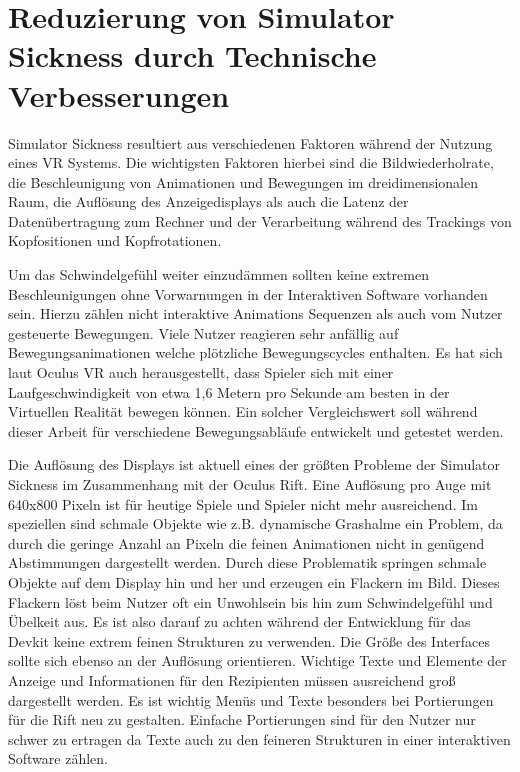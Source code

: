 \documentclass[pagesize, paper=a4, fontsize=12pt,titlepage=true, headings=small, headnosepline, abstractoff, liststotoc, nochapterprefix, plainheadsepline, twoside]{scrreprt}
\begin{document}
\section{Reduzierung von Simulator Sickness durch Technische Verbesserungen}
Simulator Sickness resultiert aus verschiedenen Faktoren während der Nutzung eines VR Systems. Die wichtigsten Faktoren hierbei sind die Bildwiederholrate, die Beschleunigung von Animationen und Bewegungen im dreidimensionalen Raum, die Auflösung des Anzeigedisplays als auch die Latenz der Datenübertragung zum Rechner und der Verarbeitung während des Trackings von Kopfositionen und Kopfrotationen. 

Um das Schwindelgefühl weiter einzudämmen sollten keine extremen Beschleunigungen ohne Vorwarnungen in der Interaktiven Software vorhanden sein. Hierzu zählen nicht interaktive Animations Sequenzen als auch vom Nutzer gesteuerte Bewegungen. Viele Nutzer reagieren sehr anfällig auf Bewegungsanimationen welche plötzliche Bewegungscycles enthalten. Es hat sich laut Oculus VR auch herausgestellt, dass Spieler sich mit einer Laufgeschwindigkeit von etwa 1,6 Metern pro Sekunde am besten in der Virtuellen Realität bewegen können. Ein solcher Vergleichswert soll während dieser Arbeit für verschiedene Bewegungsabläufe entwickelt und getestet werden.

Die Auflösung des Displays ist aktuell eines der größten Probleme der Simulator Sickness im Zusammenhang mit der Oculus Rift.  Eine Auflösung pro Auge mit 640x800 Pixeln ist für heutige Spiele und Spieler nicht mehr ausreichend. Im speziellen sind schmale Objekte wie z.B. dynamische Grashalme ein Problem, da durch die geringe Anzahl an Pixeln die feinen Animationen nicht in genügend Abstimmungen dargestellt werden. Durch diese Problematik springen schmale Objekte auf dem Display hin und her und erzeugen ein Flackern im Bild. Dieses Flackern löst beim Nutzer oft ein Unwohlsein bis hin zum Schwindelgefühl und Übelkeit aus. Es ist also darauf zu achten während der Entwicklung für das Devkit keine extrem feinen Strukturen zu verwenden. Die Größe des Interfaces sollte sich ebenso an der Auflösung orientieren. Wichtige Texte und Elemente der Anzeige und Informationen für den Rezipienten müssen ausreichend groß dargestellt werden. Es ist wichtig Menüs und Texte besonders bei Portierungen für die Rift neu zu gestalten. Einfache Portierungen sind für den Nutzer nur schwer zu ertragen da Texte auch zu den feineren Strukturen in einer interaktiven Software zählen.
\end{document}
